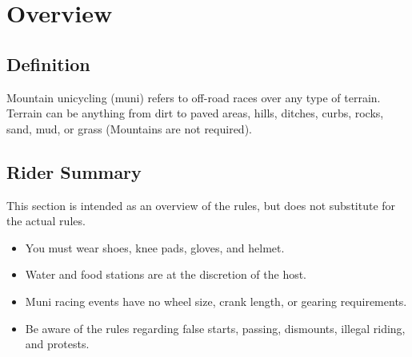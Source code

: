 \chapter{Overview \label{chap:muni_racing}}

\section{Definition}

Mountain unicycling (muni) refers to off-road races over any type of terrain.
Terrain can be anything from dirt to paved areas, hills, ditches, curbs, rocks, sand, mud, or grass (Mountains are not required).

\section{Rider Summary}

This section is intended as an overview of the rules, but does not
substitute for the actual rules.
\begin{itemize}
    \item You must wear shoes, knee pads, gloves, and helmet.
    \item Water and food stations are at the discretion of the host.
    \item Muni racing events have no wheel size, crank length, or gearing
    requirements.
    \item Be aware of the rules regarding false starts, passing, dismounts, illegal riding, and protests.
\end{itemize}
